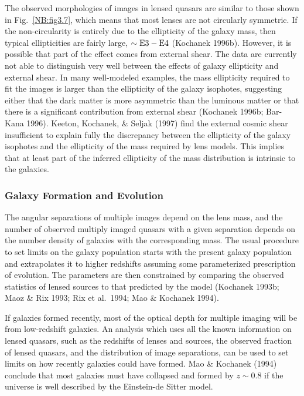 \documentclass[a4paper,10pt]{article} %
\begin{document}
The observed morphologies of images in lensed quasars are similar to
those shown in Fig.\ \ref{NB:fig3.7}, which means that most lenses are
not circularly symmetric. If the non-circularity is entirely due to
the ellipticity of the galaxy mass, then typical ellipticities are
fairly large, $\sim{\rm E}3-{\rm E}4$ (Kochanek 1996b). However, it is
possible that part of the effect comes from external shear. The data
are currently not able to distinguish very well between the effects of
galaxy ellipticity and external shear. In many well-modeled examples,
the mass ellipticity required to fit the images is larger than the
ellipticity of the galaxy isophotes, suggesting either that the dark
matter is more asymmetric than the luminous matter or that there is a
significant contribution from external shear (Kochanek 1996b; Bar-Kana
1996). Keeton, Kochanek, \& Seljak (1997) find the external cosmic
shear insufficient to explain fully the discrepancy between the
ellipticity of the galaxy isophotes and the ellipticity of the mass
required by lens models. This implies that at least part of the
inferred ellipticity of the mass distribution is intrinsic to the
galaxies.

\subsubsection{Galaxy Formation and Evolution}
\label{NB:subsubsect3.7.2}

The angular separations of multiple images depend on the lens mass,
and the number of observed multiply imaged quasars with a given
separation depends on the number density of galaxies with the
corresponding mass. The usual procedure to set limits on the galaxy
population starts with the present galaxy population and extrapolates
it to higher redshifts assuming some parameterized prescription of
evolution. The parameters are then constrained by comparing the
observed statistics of lensed sources to that predicted by the model
(Kochanek 1993b; Maoz \& Rix 1993; Rix et al.\ 1994; Mao \& Kochanek
1994).

If galaxies formed recently, most of the optical depth for multiple
imaging will be from low-redshift galaxies. An analysis which uses all
the known information on lensed quasars, such as the redshifts of
lenses and sources, the observed fraction of lensed quasars, and the
distribution of image separations, can be used to set limits on how
recently galaxies could have formed. Mao \& Kochanek (1994) conclude
that most galaxies must have collapsed and formed by $z\sim0.8$ if the
universe is well described by the Einstein-de Sitter model.
\end{document}
